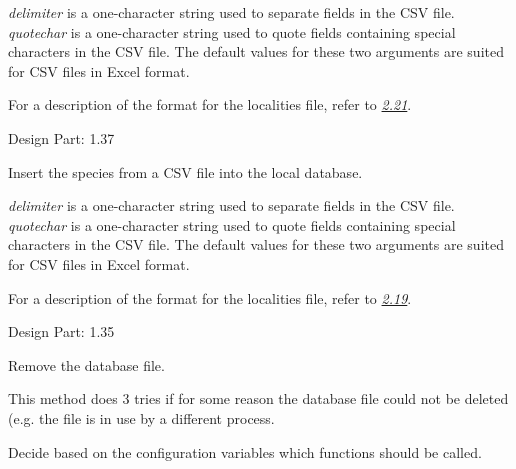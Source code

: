 \documentclass[letterpaper,10pt,english]{sphinxmanual}
\begin{document}
\begin{fulllineitems}
\begin{fulllineitems}
\emph{delimiter} is a one-character string used to separate fields
in the CSV file. \emph{quotechar} is a one-character string used to
quote fields containing special characters in the CSV file.
The default values for these two arguments are suited for CSV
files in Excel format.

For a description of the format for the localities file, refer
to {\hyperref[design_parts_data:design-part-data-2-21]{\emph{2.21}}}.

Design Part: 1.37

\end{fulllineitems}


\begin{fulllineitems}
\label{setlyze/database:setlyze.database.MakeLocalDB.insert_species_from_csv}
Insert the species from a CSV file into the local database.

\emph{delimiter} is a one-character string used to separate fields
in the CSV file. \emph{quotechar} is a one-character string used to
quote fields containing special characters in the CSV file.
The default values for these two arguments are suited for CSV
files in Excel format.

For a description of the format for the localities file, refer
to {\hyperref[design_parts_data:design-part-data-2-19]{\emph{2.19}}}.

Design Part: 1.35

\end{fulllineitems}


\begin{fulllineitems}
\label{setlyze/database:setlyze.database.MakeLocalDB.remove_db_file}
Remove the database file.

This method does 3 tries if for some reason the database file
could not be deleted (e.g. the file is in use by a different
process.

\end{fulllineitems}


\begin{fulllineitems}
\label{setlyze/database:setlyze.database.MakeLocalDB.run}
Decide based on the configuration variables which functions
should be called.


\end{fulllineitems}
\end{fulllineitems}
\end{document}
